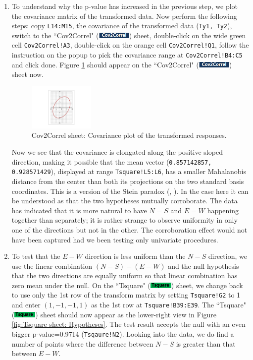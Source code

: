 \documentclass[article]{jss}
\numberwithin{equation}{subsection}
\newcommand{\shtTsquare}{``Tsquare" (\includegraphics[height=8pt, keepaspectratio=true]{TsquareSheetTab_png}) }
\newcommand{\shtCovCorrel}{``Cov2Correl" (\includegraphics[height=8pt, keepaspectratio=true]{Cov2CorrelSheetTab_png}) }
\begin{document}
\begin{enumerate}
                \item To understand why the p-value has increased in the previous step, we plot the covariance matrix of the transformed data. Now perform the following steps: copy \texttt{L14:M15}, the covariance of the transformed data (\texttt{Ty1, Ty2}), switch to the \shtCovCorrel sheet, double-click on the wide green cell \texttt{Cov2Correl!A3}, double-click on the orange cell \texttt{Cov2Correl!Q1}, follow the instruction on the popup to pick the covariance range at \texttt{Cov2Correl!B4:C5} and click done. Figure \ref{fig:Cov2Correl_PlotCov} should appear on the \shtCovCorrel sheet now.
                
                \begin{figure}[!tbh]
                        \includegraphics[width=90pt,keepaspectratio=true]{img/Cov2Correl_PlotCov}
                        \vspace{-10pt}\centering\protect\caption{Cov2Correl sheet: Covariance plot of the transformed responses.}\label{fig:Cov2Correl_PlotCov}
                \end{figure}
                
        
                Now we see that the covariance is elongated along the positive sloped direction, making it possible that the mean vector (\texttt{0.857142857, 0.928571429}), displayed at range \texttt{Tsquare!L5:L6}, has a smaller Mahalanobis distance from the center than both its projections on the two standard basis coordinates. This is a version of the Stein paradox (\cite{SteinCM1956InadmissibilityoftheUsualEstima}, \cite{CasellaHwang2012}). In the case here it can be understood as that the two hypotheses mutually corroborate. The data has indicated that it is more natural to have $N=S$ and $E=W$ happening together than separately; it is rather strange to observe uniformity in only one of the directions but not in the other. The corroboration effect would not have been captured had we been testing only univariate procedures.
                
                
                \item To test that the $E-W$ direction is less uniform than the $N-S$ direction, we use the linear combination $(N-S)-(E-W)$ and the null hypothesis that the two directions are equally uniform so that linear combination has zero mean under the null. On the \shtTsquare sheet, we change back to use only the 1st row of the transform matrix by setting \texttt{Tsquare!G2} to 1 and enter $(1,-1,-1,1)$ as the 1st row at \texttt{Tsquare!B39:E39}. The \shtTsquare sheet should now appear as the lower-right view in Figure \ref{fig:Tsquare sheet: Hypotheses}. The test result accepts the null with an even bigger p-value=0.9714 (\texttt{Tsqaure!N2}). Looking into the data, we do find a number of points where the difference between $N-S$ is greater than that between $E-W$.
                

\end{enumerate}
\end{document}
